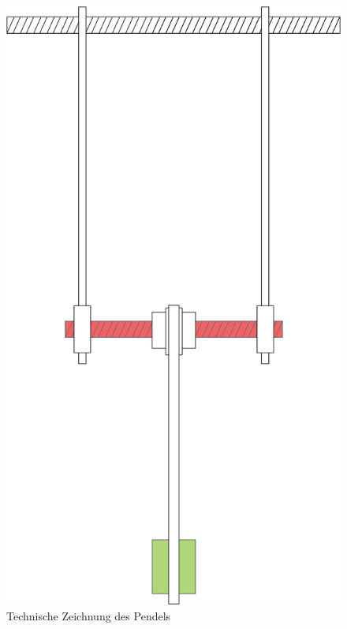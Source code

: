 \begin{figure}
\centering
\includegraphics[width=.6\textwidth]{images/pendel-skizze.png}
\caption{Technische Zeichnung des Pendels}
\label{pic:skizze_versuchsaufbau}
\end{figure}


